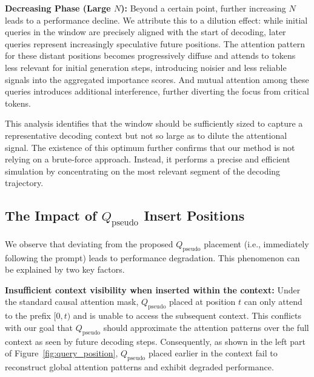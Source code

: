 \textbf{Decreasing Phase (Large $N$):} Beyond a certain point, further increasing $N$ leads to a performance decline. We attribute this to a dilution effect: while initial queries in the window are precisely aligned with the start of decoding, later queries represent increasingly speculative future positions. The attention pattern for these distant positions becomes progressively diffuse and attends to tokens less relevant for initial generation steps, introducing noisier and less reliable signals into the aggregated importance scores. And mutual attention among these queries introduces additional interference, further diverting the focus from critical tokens.


This analysis identifies that the window should be sufficiently sized to capture a representative decoding context but not so large as to dilute the attentional signal. The existence of this optimum further confirms that our method is not relying on a brute-force approach. Instead, it performs a precise and efficient simulation by concentrating on the most relevant segment of the decoding trajectory.



\subsection{The Impact of \texorpdfstring{\(Q_{\text{pseudo}}\)}{Q\_pseudo} Insert Positions}

We observe that deviating from the proposed \texorpdfstring{\(Q_{\text{pseudo}}\)}{Q\_pseudo} placement (i.e., immediately following the prompt) leads to performance degradation. This phenomenon can be explained by two key factors.

\textbf{Insufficient context visibility when inserted within the context:} Under the standard causal attention mask, \texorpdfstring{\(Q_{\text{pseudo}}\)}{Q\_pseudo} placed at position $t$ can only attend to the prefix $[0, t)$ and is unable to access the subsequent context. This conflicts with our goal that \texorpdfstring{\(Q_{\text{pseudo}}\)}{Q\_pseudo} should approximate the attention patterns over the full context as seen by future decoding steps. Consequently, as shown in the left part of Figure~\ref{fig:query_position}, \texorpdfstring{\(Q_{\text{pseudo}}\)}{Q\_pseudo} placed earlier in the context fail to reconstruct global attention patterns and exhibit degraded performance.

